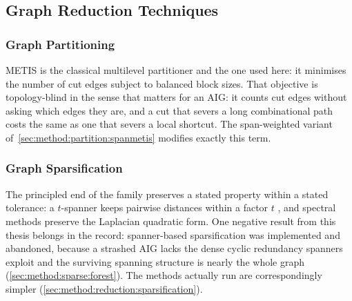 \subsection{Graph Reduction Techniques}
\label{sec:relwork:reduction}

\subsubsection{Graph Partitioning}
\label{sec:relwork:reduction:partitioning}
METIS \citep{karypis1997metis} is the classical multilevel partitioner and the one used
here: it minimises the number of cut edges subject to balanced block sizes. That
objective is topology-blind in the sense that matters for an AIG\@: it counts cut edges
without asking which edges they are, and a cut that severs a long combinational path
costs the same as one that severs a local shortcut. The span-weighted variant
of~\ref{sec:method:partition:spanmetis} modifies exactly this term.

\subsubsection{Graph Sparsification}
\label{sec:relwork:reduction:sparsification}
The principled end of the family preserves a stated property within a stated tolerance:
a $t$-spanner keeps pairwise distances within a factor $t$
\citep{peleg1989spanners,baswana2007spanners}, and spectral methods preserve the
Laplacian quadratic form. One negative result from this thesis belongs in the record:
spanner-based sparsification was implemented and abandoned, because a strashed AIG lacks
the dense cyclic redundancy spanners exploit and the surviving spanning structure is
nearly the whole graph (\ref{sec:method:sparse:forest}). The methods actually run are
correspondingly simpler (\ref{sec:method:reduction:sparsification}).

